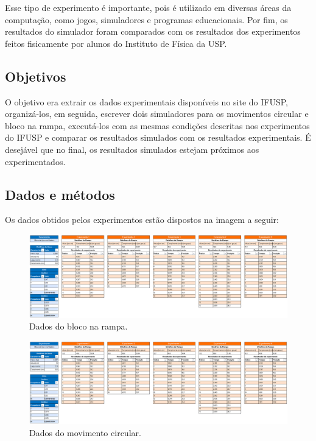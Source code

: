 \documentclass{article}
\begin{document}
\qquad Esse tipo de experimento é importante, pois é utilizado em diversas áreas da computação, como jogos, simuladores e programas educacionais. Por fim, os resultados do simulador foram comparados com os resultados dos experimentos feitos fisicamente por alunos do Instituto de Física da USP. 

\subsection{Objetivos}

\qquad O objetivo era extrair os dados experimentais disponíveis no site do IFUSP, organizá-los, em seguida, escrever dois simuladores para os movimentos circular e bloco na rampa, executá-los com as mesmas condições descritas nos experimentos do IFUSP e comparar os resultados simulados com os resultados experimentais. É desejável que no final, os resultados simulados estejam próximos aos experimentados. 


\subsection{Dados e métodos}
Os dados obtidos pelos experimentos estão dispostos na imagem a seguir:

\vspace{0.5cm}

\begin{figure}[!h]
    \centering
    \includegraphics[width=16cm]{./img/tabelas_bloco_rampa.png}
    \caption{Dados do bloco na rampa.}
\end{figure}

\vspace{0.5cm}

\begin{figure}[!h]
    \centering
    \includegraphics[width=16cm]{./img/tabelas_bloco_rampa.png}
    \caption{Dados do movimento circular.}
\end{figure}
\end{document}
